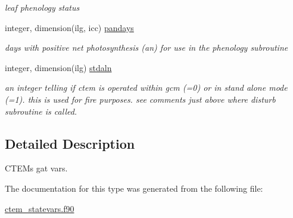 \begin{DoxyCompactItemize}
\begin{DoxyCompactList}\small\item\em leaf phenology status \end{DoxyCompactList}\item 
\hypertarget{structctem__statevars_1_1veg__gat_a66e9b1908bda5c65e1d62cea368c8615}{}integer, dimension(ilg, icc) \hyperlink{structctem__statevars_1_1veg__gat_a66e9b1908bda5c65e1d62cea368c8615}{pandays}\label{structctem__statevars_1_1veg__gat_a66e9b1908bda5c65e1d62cea368c8615}

\begin{DoxyCompactList}\small\item\em days with positive net photosynthesis (an) for use in the phenology subroutine \end{DoxyCompactList}\item 
\hypertarget{structctem__statevars_1_1veg__gat_ac275495e600c2b8a67b29b7045c725c1}{}integer, dimension(ilg) \hyperlink{structctem__statevars_1_1veg__gat_ac275495e600c2b8a67b29b7045c725c1}{stdaln}\label{structctem__statevars_1_1veg__gat_ac275495e600c2b8a67b29b7045c725c1}

\begin{DoxyCompactList}\small\item\em an integer telling if ctem is operated within gcm (=0) or in stand alone mode (=1). this is used for fire purposes. see comments just above where disturb subroutine is called. \end{DoxyCompactList}\end{DoxyCompactItemize}


\subsection{Detailed Description}
C\+T\+E\+M\textquotesingle{}s \textquotesingle{}gat\textquotesingle{} vars. 

The documentation for this type was generated from the following file\+:\begin{DoxyCompactItemize}
\item 
\hyperlink{ctem__statevars_8f90}{ctem\+\_\+statevars.\+f90}\end{DoxyCompactItemize}
